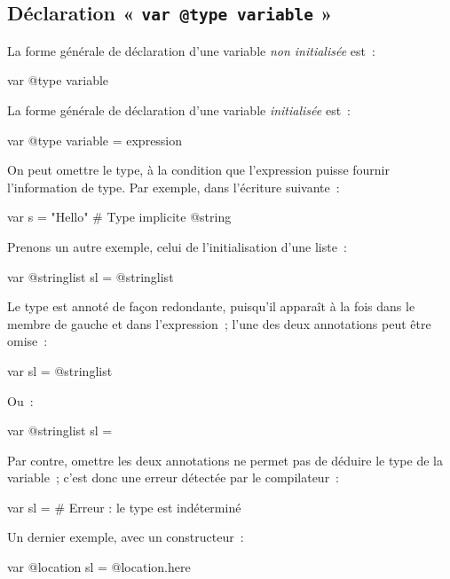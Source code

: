 \subsection{Déclaration « \texttt{var @type variable} »}

La forme générale de déclaration d'une variable \emph{non initialisée} est~:
\begin{galgas3box}
var @type variable
\end{galgas3box}





La forme générale de déclaration d'une variable \emph{initialisée} est~:
\begin{galgas3box}
var @type variable = expression
\end{galgas3box}

On peut omettre le type, à la condition que l'expression puisse fournir l'information de type. Par exemple, dans l'écriture suivante~:
\begin{galgas3}
var s = "Hello" # Type implicite @string
\end{galgas3}


Prenons un autre exemple, celui de l'initialisation d'une liste~:
\begin{galgas3}
var @stringlist sl = @stringlist {}
\end{galgas3}

Le type est annoté de façon redondante, puisqu'il apparaît à la fois dans le membre de gauche et dans l'expression~; l'une des deux annotations peut être omise~:
\begin{galgas3}
var sl = @stringlist {}
\end{galgas3}

Ou~:
\begin{galgas3}
var @stringlist sl = {}
\end{galgas3}

Par contre, omettre les deux annotations ne permet pas de déduire le type de la variable~; c'est donc une erreur détectée par le compilateur~:
\begin{galgas3}
var sl = {} # Erreur : le type est indéterminé
\end{galgas3}

Un dernier exemple, avec un constructeur~:
\begin{galgas3}
var @location sl = @location.here
\end{galgas3}


